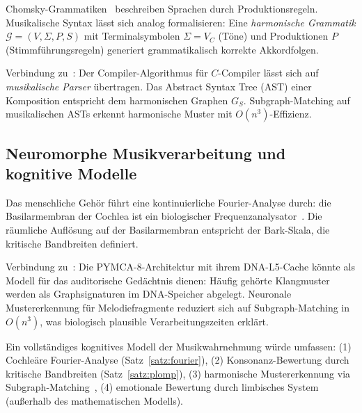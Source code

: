 ﻿\documentclass[a4paper,12pt]{article}
\theoremstyle{definition}
\begin{document}
Chomsky-Grammatiken~\cite{chomsky1957} beschreiben Sprachen durch Produktionsregeln.
Musikalische Syntax lässt sich analog formalisieren: Eine \emph{harmonische
Grammatik} $\mathcal{G} = (V, \Sigma, P, S)$ mit Terminalsymbolen $\Sigma = V_C$
(Töne) und Produktionen $P$ (Stimmführungsregeln) generiert grammatikalisch korrekte
Akkordfolgen.

Verbindung zu~\cite{epp2026ccl}: Der Compiler-Algorithmus für $C$-Compiler lässt sich
auf \emph{musikalische Parser} übertragen. Das Abstract Syntax Tree (AST) einer
Komposition entspricht dem harmonischen Graphen $G_S$. Subgraph-Matching auf
musikalischen ASTs erkennt harmonische Muster mit $O(n^3)$-Effizienz.

\subsection{Neuromorphe Musikverarbeitung und kognitive Modelle}

Das menschliche Gehör führt eine kontinuierliche Fourier-Analyse durch:
die Basilarmembran der Cochlea ist ein biologischer Frequenzanalysator~\cite{epp2026brn}.
Die räumliche Auflösung auf der Basilarmembran entspricht der Bark-Skala,
die kritische Bandbreiten definiert.

Verbindung zu~\cite{epp2026pymca8}: Die PYMCA-8-Architektur mit ihrem DNA-L5-Cache
könnte als Modell für das auditorische Gedächtnis dienen: Häufig gehörte Klangmuster
werden als Graphsignaturen im DNA-Speicher abgelegt. Neuronale Mustererkennung
für Melodiefragmente reduziert sich auf Subgraph-Matching in $O(n^3)$, was
biologisch plausible Verarbeitungszeiten erklärt.

Ein vollständiges kognitives Modell der Musikwahrnehmung würde umfassen:
(1) Cochleäre Fourier-Analyse (Satz~\ref{satz:fourier}), (2) Konsonanz-Bewertung
durch kritische Bandbreiten (Satz~\ref{satz:plomp}), (3) harmonische
Mustererkennung via Subgraph-Matching~\cite{epp2026subgraph},
(4) emotionale Bewertung durch limbisches System (außerhalb des mathematischen Modells).
\end{document}
